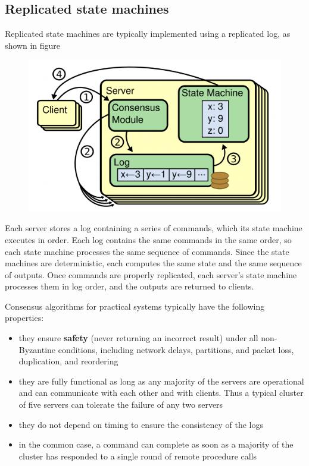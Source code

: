 \documentclass[11pt]{article}
\begin{document}
\subsection{Replicated state machines}
\label{sec:org50fe155}
Replicated state machines are typically implemented using a replicated log, as shown in figure
\begin{figure}[htbp]
\centering
\includegraphics[width=.7\textwidth]{../images/6.824/2.png}
\label{}
\end{figure}
Each server stores a log containing a series of commands, which its state machine executes in
order. Each log contains the same commands in the same order, so each state machine processes
the same sequence of commands. Since the state machines are deterministic, each computes the
same state and the same sequence of outputs. Once commands are properly replicated, each
server’s state machine processes them in log order, and the outputs are returned to clients.

Consensus algorithms for practical systems typically have the following properties:
\begin{itemize}
\item they ensure \textbf{safety} (never returning an incorrect result) under all non-Byzantine conditions,
including network delays, partitions, and packet loss, duplication, and reordering
\item they are fully functional as long as any majority of the servers are operational and can
communicate with each other and with clients. Thus a typical cluster of five servers can
tolerate the failure of any two servers
\item they do not depend on timing to ensure the consistency of the logs
\item in the common case, a command can complete as soon as a majority of the cluster has responded
to a single round of remote procedure calls
\end{itemize}
\end{document}
